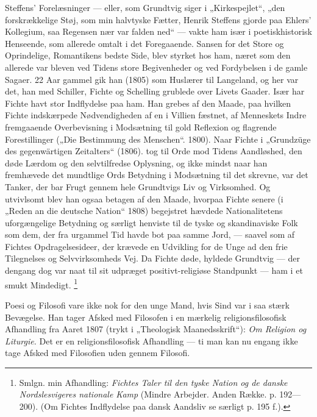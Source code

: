 \documentclass[12pt,a4paper,openany]{book}
\newcommand{\opage}[1]{\marginnote{\footnotesize\textit{[#1]}}}
\begin{document}
Steffens' Forelæsninger --- eller, som Grundtvig siger i „Kirkespejlet“, „den
forskrækkelige Støj, som min halvtyske Fætter, Henrik Steffens gjorde paa
Ehlers' Kollegium, saa Regensen nær var falden ned“ --- vakte ham især i
poetiskhistorisk Henseende, som allerede omtalt i det Foregaaende. Sansen for
det Store og Oprindelige, Romantikens bedste Side, blev styrket hos ham, næret
som den allerede var bleven ved Tidens store Begivenheder og ved Fordybelsen i de
\setcounter{footnote}{0}%
\opage{58}gamle Sagaer. 22 Aar gammel gik han (1805) som Huslærer til
Langeland, og her var det, han med Schiller, Fichte og Schelling grublede over
Livets Gaader. Især har Fichte havt stor Indflydelse paa ham. Han grebes af den
Maade, paa hvilken Fichte indskærpede Nødvendigheden af en i Villien fæstnet,
af Menneskets Indre fremgaaende Overbevisning i Modsætning til gold Reflexion
og flagrende Forestillinger („Die Bestimmung des Menschen“. 1800). Naar Fichte
i „Grundzüge des gegenwärtigen Zeitalters“ (1806). tog til Orde mod Tidens
Aandløshed, den døde Lærdom og den selvtilfredse Oplysning, og ikke mindst naar
han fremhævede det mundtlige Ords Betydning i Modsætning til det skrevne, var
det Tanker, der bar Frugt gennem hele Grundtvigs Liv og Virksomhed. Og
utvivlsomt blev han ogsaa betagen af den Maade, hvorpaa Fichte senere (i „Reden
an die deutsche Nation“ 1808) begejstret hævdede Nationalitetens uforgængelige
Betydning og særligt henviste til de tyske og skandinaviske Folk som dem, der
fra urgammel Tid havde bot paa samme Jord, --- saavel som af Fichtes
Opdragelsesideer, der krævede en Udvikling for de Unge ad den frie Tilegnelses
og Selvvirksomheds Vej. Da Fichte døde, hyldede Grundtvig --- der dengang dog
var naat til sit udpræget positivt-religiøse Standpunkt --- ham i et smukt
Mindedigt.%
\footnote[1]{Smlgn. min Afhandling: \textit{Fichtes Taler til den tyske Nation
og de danske Nordslesvigeres nationale Kamp} (Mindre Arbejder. Anden Række. p.
192---200). (Om Fichtes Indflydelse paa dansk Aandsliv se særligt p. 195 f.).}

Poesi og Filosofi vare ikke nok for den unge Mand, hvis Sind var i saa stærk
Bevægelse. Han tager Afsked med Filosofen i en mærkelig religionsfilosofisk
Afhandling fra Aaret 1807 (trykt i „Theologisk Maanedsskrift“): \textit{Om
Religion og Liturgie.} Det er en religionsfilosofisk Afhandling --- ti man kan
nu engang ikke tage Afsked med Filosofien uden gennem Filosofi.
\end{document}
